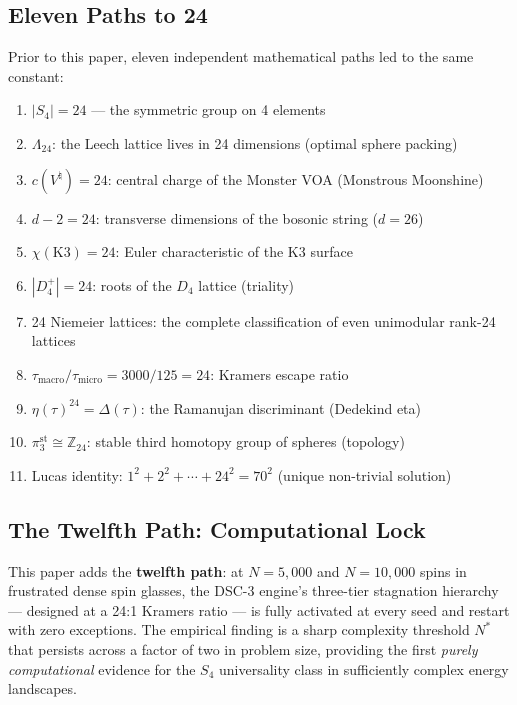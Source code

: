 \documentclass[11pt,a4paper]{article}
\begin{document}
\subsection{Eleven Paths to 24}

Prior to this paper, eleven independent mathematical paths led to the same constant:
\begin{enumerate}[nosep]
\item $|S_4| = 24$ --- the symmetric group on 4 elements
\item $\Lambda_{24}$: the Leech lattice lives in 24 dimensions (optimal sphere packing)~\cite{conway1999}
\item $c(V^\natural) = 24$: central charge of the Monster VOA (Monstrous Moonshine)
\item $d - 2 = 24$: transverse dimensions of the bosonic string ($d = 26$)
\item $\chi(\mathrm{K3}) = 24$: Euler characteristic of the K3 surface
\item $|D_4^+| = 24$: roots of the $D_4$ lattice (triality)
\item 24 Niemeier lattices: the complete classification of even unimodular rank-24 lattices
\item $\tau_{\mathrm{macro}}/\tau_{\mathrm{micro}} = 3000/125 = 24$: Kramers escape ratio~\cite{kramers1940}
\item $\eta(\tau)^{24} = \Delta(\tau)$: the Ramanujan discriminant (Dedekind eta)
\item $\pi_3^{\mathrm{st}} \cong \mathbb{Z}_{24}$: stable third homotopy group of spheres (topology)
\item Lucas identity: $1^2 + 2^2 + \cdots + 24^2 = 70^2$ (unique non-trivial solution)
\end{enumerate}

\subsection{The Twelfth Path: Computational Lock}

This paper adds the \textbf{twelfth path}: at $N = 5{,}000$ and $N = 10{,}000$ spins in frustrated dense spin glasses, the DSC-3 engine's three-tier stagnation hierarchy --- designed at a 24:1 Kramers ratio --- is fully activated at every seed and restart with zero exceptions.
The empirical finding is a sharp complexity threshold $N^*$ that persists across a factor of two in problem size, providing the first \emph{purely computational} evidence for the $S_4$ universality class in sufficiently complex energy landscapes.
\end{document}
